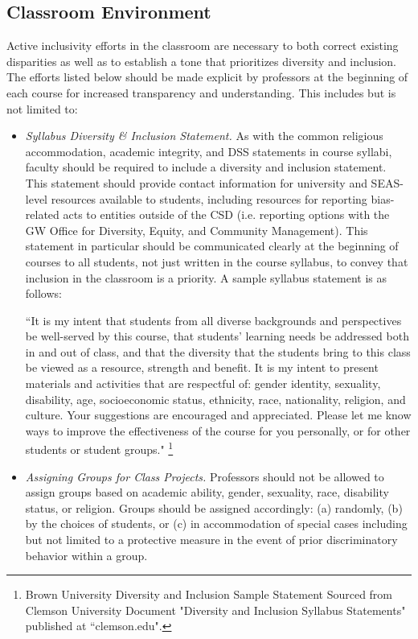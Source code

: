 \documentclass{article}
\begin{document}
\subsection{Classroom Environment} 
Active inclusivity efforts in the classroom are necessary to both correct existing disparities as well as to 
establish a tone that prioritizes diversity and inclusion. The efforts listed below should be made explicit by 
professors at the beginning of each course for increased transparency and understanding. 
This includes but is not limited to: 
\begin{itemize}
\item
\emph{Syllabus Diversity \& Inclusion Statement.} 
As with the common religious accommodation, academic integrity, and DSS statements in course syllabi, 
faculty should be required to include a diversity and inclusion statement. 
This statement should provide contact information for 
university and SEAS-level resources available to students, including resources
for reporting bias-related acts to entities outside of the CSD (i.e. reporting options 
with the GW Office for Diversity, Equity, and Community Management). 
This statement in particular should be communicated clearly at the beginning of courses to all students, 
not just written in the course syllabus, to convey that inclusion in the classroom is a priority. 
A sample syllabus statement is as follows: 
\begin{center}
``It is my intent that students from all diverse backgrounds and perspectives be well-served by this course, 
that students' learning needs be addressed both in and out of class, and that the diversity that the students 
bring to this class be viewed as a resource, strength and benefit. It is my intent to present materials and 
activities that are respectful of: gender identity, sexuality, disability, age, socioeconomic status, ethnicity, 
race, nationality, religion, and culture. Your suggestions are encouraged and appreciated. Please let me know ways to 
improve the effectiveness of the course for you personally, or for other students or student groups."
\footnote[1]{
Brown University Diversity and Inclusion Sample Statement Sourced from Clemson University Document "Diversity and Inclusion Syllabus Statements"
published at ``clemson.edu".
}

\end{center}
\item
\emph{Assigning Groups for Class Projects.} 
Professors should not be allowed to assign groups based on academic ability, gender, sexuality, race, disability
status, or religion.
Groups should be assigned accordingly: (a) randomly, (b) by the choices of students, or (c) in accommodation of special 
cases including but not limited to a protective measure in the event of prior discriminatory behavior within a group.


\end{itemize}
\end{document}
